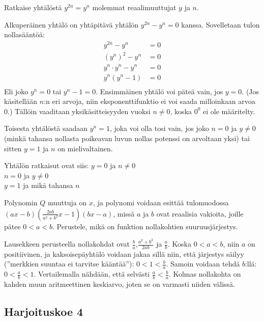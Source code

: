 \begin{tehtava}
Ratkaise yhtälöstä $y^{2n}=y^n$ molemmat reaalimuuttujat $y$ ja $n$.
	\begin{vastaus}
Alkuperäinen yhtälö on yhtäpitävä yhtälön $y^{2n}-y^n=0$ kanssa. Sovelletaan tulon nollasääntöä:
	\begin{align*}
	y^{2n}-y^n&=0 \\
	(y^n)^2-y^n&=0 \\
	y^n \cdot y^n-y^n&=0 \\
	y^n(y^n-1)&=0\\
	\end{align*}
Eli joko $y^n=0$ tai $y^n-1=0$.	 Ensimmäinen yhtälö voi päteä vain, jos $y=0$. (Jos käsitellään $n$:n eri arvoja, niin eksponenttifunktio ei voi saada milloinkaan arvoa $0$.) Tällöin vaaditaan yksikäsitteisyyden vuoksi $n\neq0$, koska $0^0$ ei ole määritelty.

Toisesta yhtälöstä saadaan $y^n=1$, joka voi olla tosi vain, jos joko $n=0$ ja $y \neq 0$ (minkä tahansa nollasta poikeavan luvun nollas potenssi on arvoltaan yksi) tai sitten $y=1$ ja $n$ on mielivaltainen.

Yhtälön ratkaisut ovat siis:
$y=0$ ja $n \neq 0$ \\
$n=0$ ja $y \neq 0$ \\
$y=1$ ja mikä tahansa $n$
	\end{vastaus}
\end{tehtava}

\begin{tehtava}
Polynomin $Q$ muuttuja on $x$, ja polynomi voidaan esittää tulomuodossa $(ax-b)(\frac{2ab}{a^2+b^2}x-1)(bx-a)$, missä $a$ ja $b$ ovat reaalisia vakioita, joille pätee $0<a<b$. Perustele, mikä on funktion nollakohtien suuruusjärjestys.
		\begin{vastaus}
Lausekkeen perusteella nollakohdat ovat $\frac{b}{a}$,$\frac{a^2+b^2}{2ab}$ ja $\frac{a}{b}$. Koska $0<a<b$, niin $a$ on positiivinen, ja kaksoisepäyhtälö voidaan jakaa sillä niin, että järjestys säilyy (''merkkien suuntaa ei tarvitse kääntää''): $0<1<\frac{b}{a}$. Samoin voidaan tehdä $b$:llä: $0<\frac{a}{b}<1$. Vertailemalla nähdään, että selvästi $\frac{a}{b}<\frac{b}{a}$. Kolmas nollakohta on kahden muun aritmeettinen keskiarvo, joten se on varmasti niiden välissä.
		\end{vastaus}
\end{tehtava}
\newpage

\subsection*{Harjoituskoe 4}

